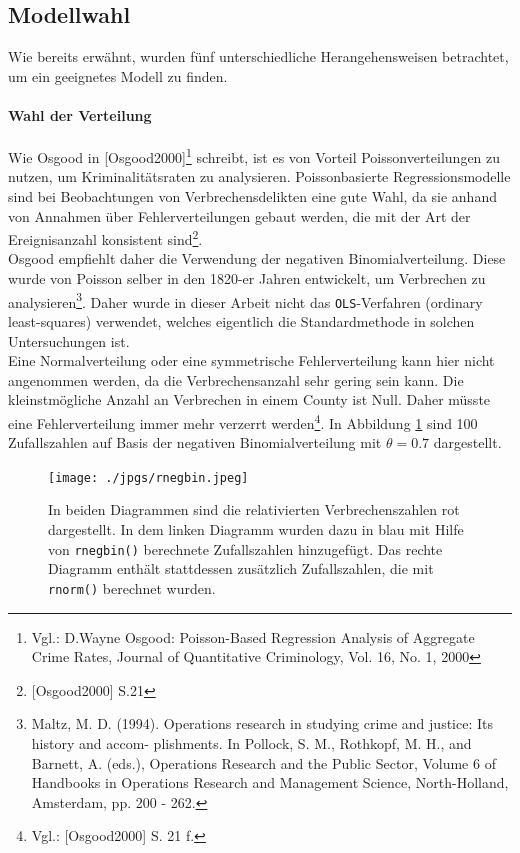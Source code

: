 \subsection{Modellwahl}
Wie bereits erw\"ahnt, wurden f\"unf unterschiedliche Herangehensweisen betrachtet, um ein geeignetes Modell zu finden.

\paragraph{Wahl der Verteilung}
Wie Osgood in [Osgood2000]\footnote{Vgl.: D.Wayne Osgood: Poisson-Based Regression Analysis of Aggregate
Crime Rates, Journal of Quantitative Criminology, Vol. 16, No. 1, 2000}
schreibt, ist es von Vorteil Poissonverteilungen zu nutzen, um Kriminalit\"atsraten zu analysieren.
Poissonbasierte Regressionsmodelle sind bei Beobachtungen von Verbrechensdelikten eine gute Wahl, da sie anhand von Annahmen \"uber Fehlerverteilungen gebaut werden, die mit der Art der Ereignisanzahl konsistent sind\footnote{[Osgood2000] S.21}. \\
Osgood empfiehlt daher die Verwendung der negativen Binomialverteilung. Diese wurde von Poisson selber in den 1820-er Jahren entwickelt, um Verbrechen zu analysieren\footnote{Maltz, M. D. (1994). Operations research in studying crime and justice: Its history and accom-
plishments. In Pollock, S. M., Rothkopf, M. H., and Barnett, A. (eds.), Operations
Research and the Public Sector, Volume 6 of Handbooks in Operations Research and
Management Science, North-Holland, Amsterdam, pp. 200 - 262.}.
Daher wurde in dieser Arbeit nicht das \texttt{OLS}-Verfahren (ordinary least-squares) verwendet, welches eigentlich die Standardmethode in solchen Untersuchungen ist. \\
Eine Normalverteilung oder eine symmetrische Fehlerverteilung kann hier nicht angenommen werden, da die Verbrechensanzahl sehr gering sein kann.
Die kleinstm\"ogliche Anzahl an Verbrechen in einem County ist Null.
Daher m\"usste eine Fehlerverteilung immer mehr verzerrt werden\footnote{Vgl.: [Osgood2000] S. 21 f.}.
In Abbildung \ref{fig:nbd} sind 100 Zufallszahlen auf Basis der negativen Binomialverteilung mit $\theta = 0.7$ dargestellt.

\begin{figure}
\centering
\texttt{[image: ./jpgs/rnegbin.jpeg]}
\caption{In beiden Diagrammen sind die relativierten Verbrechenszahlen rot dargestellt.
		 In dem linken Diagramm wurden dazu in blau mit Hilfe von \texttt{rnegbin()} berechnete     Zufallszahlen hinzugef\"ugt.
		 Das rechte Diagramm enth\"alt stattdessen zus\"atzlich Zufallszahlen, die mit \texttt{rnorm()} berechnet wurden.}
\label{fig:nbd}
\end{figure}
\par\smallskip

